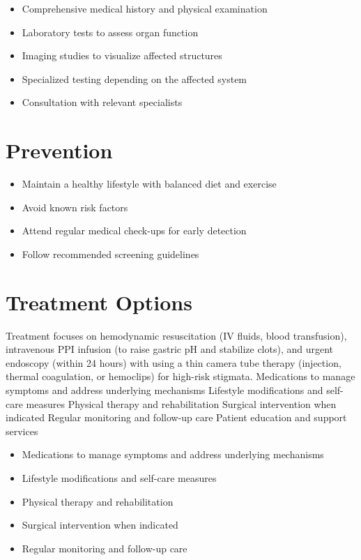 \begin{itemize}[noitemsep]
  \item Comprehensive medical history and physical examination
  \item Laboratory tests to assess organ function
  \item Imaging studies to visualize affected structures
  \item Specialized testing depending on the affected system
  \item Consultation with relevant specialists
\end{itemize}
\section{Prevention}
\begin{itemize}[noitemsep]
  \item Maintain a healthy lifestyle with balanced diet and exercise
  \item Avoid known risk factors
  \item Attend regular medical check-ups for early detection
  \item Follow recommended screening guidelines
\end{itemize}
\section{Treatment Options}
Treatment focuses on hemodynamic resuscitation (IV fluids, blood transfusion), intravenous PPI infusion (to raise gastric pH and stabilize clots), and urgent endoscopy (within 24 hours) with using a thin camera tube therapy (injection, thermal coagulation, or hemoclips) for high-risk stigmata. Medications to manage symptoms and address underlying mechanisms Lifestyle modifications and self-care measures Physical therapy and rehabilitation Surgical intervention when indicated Regular monitoring and follow-up care Patient education and support services

\begin{itemize}[noitemsep]
  \item Medications to manage symptoms and address underlying mechanisms
  \item Lifestyle modifications and self-care measures
  \item Physical therapy and rehabilitation
  \item Surgical intervention when indicated
  \item Regular monitoring and follow-up care
\end{itemize}
